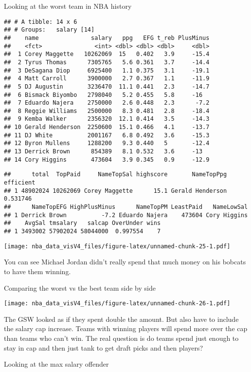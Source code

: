 \documentclass[]{article}
\begin{document}
Looking at the worst team in NBA history

\begin{verbatim}
## # A tibble: 14 x 6
## # Groups:   salary [14]
##    name               salary   ppg   EFG t_reb PlusMinus
##    <fct>               <int> <dbl> <dbl> <dbl>     <dbl>
##  1 Corey Maggette   10262069  15   0.402   3.9     -15.4
##  2 Tyrus Thomas      7305765   5.6 0.361   3.7     -14.4
##  3 DeSagana Diop     6925400   1.1 0.375   3.1     -19.1
##  4 Matt Carroll      3900000   2.7 0.367   1.1     -11.9
##  5 DJ Augustin       3236470  11.1 0.441   2.3     -14.7
##  6 Bismack Biyombo   2798040   5.2 0.455   5.8     -16  
##  7 Eduardo Najera    2750000   2.6 0.448   2.3      -7.2
##  8 Reggie Williams   2500000   8.3 0.481   2.8     -18.4
##  9 Kemba Walker      2356320  12.1 0.414   3.5     -14.3
## 10 Gerald Henderson  2250600  15.1 0.466   4.1     -13.7
## 11 DJ White          2001167   6.8 0.492   3.6     -15.3
## 12 Byron Mullens     1288200   9.3 0.440   5       -12.4
## 13 Derrick Brown      854389   8.1 0.532   3.6     -13  
## 14 Cory Higgins       473604   3.9 0.345   0.9     -12.9
\end{verbatim}

\begin{verbatim}
##      total  TopPaid     NameTopSal highscore       NameTopPpg efficient
## 1 48902024 10262069 Corey Maggette      15.1 Gerald Henderson  0.531746
##      NameTopEFG HighPlusMinus      NameTopPM LeastPaid   NameLowSal
## 1 Derrick Brown          -7.2 Eduardo Najera    473604 Cory Higgins
##    AvgSal tmsalary   salcap OverUnder wins
## 1 3493002 57902024 58044000  0.997554    7
\end{verbatim}

\texttt{[image: nba\_data\_visV4\_files/figure-latex/unnamed-chunk-25-1.pdf]}

You can see Michael Jordan didn't really spend that much money on his
bobcats to have them winning.

Comparing the worst vs the best team side by side

\texttt{[image: nba\_data\_visV4\_files/figure-latex/unnamed-chunk-26-1.pdf]}

The GSW looked as if they spent double the amount. But also have to
include the salary cap increase. Teams with winning players will spend
more over the cap than teams who can't win. The real question is do
teams spend just enough to stay in cap and then just tank to get draft
picks and then players?

Looking at the max salary offender
\end{document}
